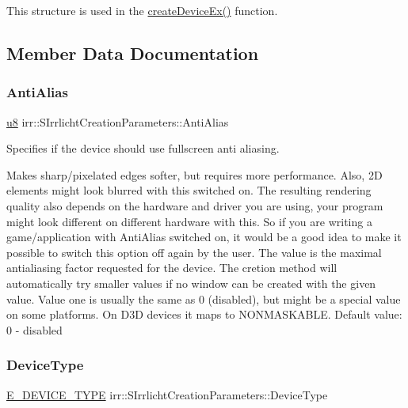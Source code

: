 This structure is used in the \hyperlink{namespaceirr_ac83a30d674204dcb94d70f849e9b4a62}{create\+Device\+Ex()} function. 

\subsection{Member Data Documentation}
\mbox{\label{structirr_1_1SIrrlichtCreationParameters_a50602e6ae0cc3d79ca7df0aa8114e75a}} 
\subsubsection{\texorpdfstring{Anti\+Alias}{AntiAlias}}
{\footnotesize\ttfamily \hyperlink{namespaceirr_a646874f69af8ff87fc10201b0254a761}{u8} irr\+::\+S\+Irrlicht\+Creation\+Parameters\+::\+Anti\+Alias}



Specifies if the device should use fullscreen anti aliasing. 

Makes sharp/pixelated edges softer, but requires more performance. Also, 2D elements might look blurred with this switched on. The resulting rendering quality also depends on the hardware and driver you are using, your program might look different on different hardware with this. So if you are writing a game/application with Anti\+Alias switched on, it would be a good idea to make it possible to switch this option off again by the user. The value is the maximal antialiasing factor requested for the device. The cretion method will automatically try smaller values if no window can be created with the given value. Value one is usually the same as 0 (disabled), but might be a special value on some platforms. On D3D devices it maps to N\+O\+N\+M\+A\+S\+K\+A\+B\+LE. Default value\+: 0 -\/ disabled \mbox{\label{structirr_1_1SIrrlichtCreationParameters_a76520addbdf96ee3b3f00cb7f55076e5}} 
\subsubsection{\texorpdfstring{Device\+Type}{DeviceType}}
{\footnotesize\ttfamily \hyperlink{namespaceirr_ac25d94cf2e1037c7ca18ee79b3bd4505}{E\+\_\+\+D\+E\+V\+I\+C\+E\+\_\+\+T\+Y\+PE} irr\+::\+S\+Irrlicht\+Creation\+Parameters\+::\+Device\+Type}



